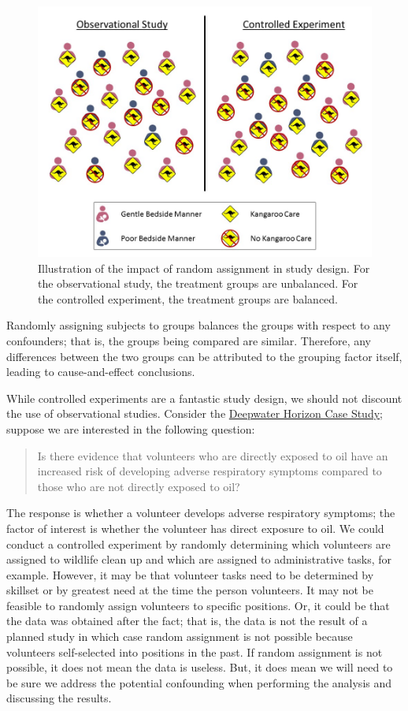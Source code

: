 \documentclass[]{book}
\theoremstyle{plain}
\theoremstyle{mydefn}
\theoremstyle{myexmpl}
\theoremstyle{remark}
\let\BeginKnitrBlock\begin \let\EndKnitrBlock\end
\let\BeginKnitrBlock\begin \let\EndKnitrBlock\end
\begin{document}
\begin{figure}

{\centering \includegraphics[width=0.8\linewidth]{./images/Data-Randomization} 

}

\caption{Illustration of the impact of random assignment in study design. For the observational study, the treatment groups are unbalanced.  For the controlled experiment, the treatment groups are balanced.}\label{fig:data-randomization}
\end{figure}

\BeginKnitrBlock{rmdkeyidea}
Randomly assigning subjects to groups balances the groups with respect
to any confounders; that is, the groups being compared are similar.
Therefore, any differences between the two groups can be attributed to
the grouping factor itself, leading to cause-and-effect conclusions.
\EndKnitrBlock{rmdkeyidea}

While controlled experiments are a fantastic study design, we should not
discount the use of observational studies. Consider the
\protect\hyperlink{CaseDeepwater}{Deepwater Horizon Case Study}; suppose
we are interested in the following question:

\begin{quote}
Is there evidence that volunteers who are directly exposed to oil have
an increased risk of developing adverse respiratory symptoms compared to
those who are not directly exposed to oil?
\end{quote}

The response is whether a volunteer develops adverse respiratory
symptoms; the factor of interest is whether the volunteer has direct
exposure to oil. We could conduct a controlled experiment by randomly
determining which volunteers are assigned to wildlife clean up and which
are assigned to administrative tasks, for example. However, it may be
that volunteer tasks need to be determined by skillset or by greatest
need at the time the person volunteers. It may not be feasible to
randomly assign volunteers to specific positions. Or, it could be that
the data was obtained after the fact; that is, the data is not the
result of a planned study in which case random assignment is not
possible because volunteers self-selected into positions in the past. If
random assignment is not possible, it does not mean the data is useless.
But, it does mean we will need to be sure we address the potential
confounding when performing the analysis and discussing the results.
\end{document}
